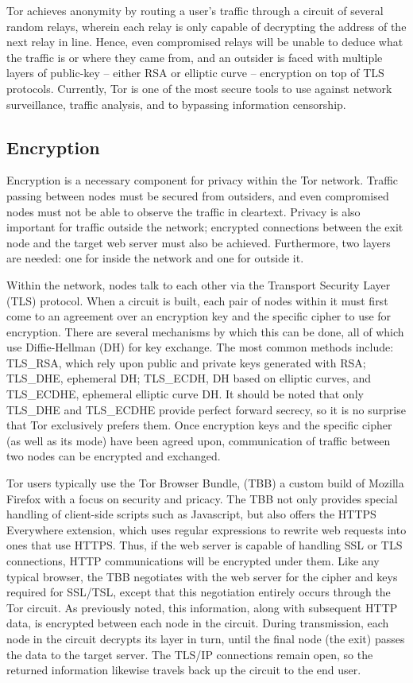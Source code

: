 \documentclass[journal]{IEEEtran}
\begin{document}
Tor achieves anonymity by routing a user's traffic through a circuit of several random relays, wherein each relay is only capable of decrypting the address of the next relay in line. Hence, even compromised relays will be unable to deduce what the traffic is or where they came from, and an outsider is faced with multiple layers of public-key -- either RSA or elliptic curve -- encryption on top of TLS protocols. Currently, Tor is one of the most secure tools to use against network surveillance, traffic analysis, and to bypassing information censorship.

\subsection{Encryption}

Encryption is a necessary component for privacy within the Tor network. Traffic passing between nodes must be secured from outsiders, and even compromised nodes must not be able to observe the traffic in cleartext. Privacy is also important for traffic outside the network; encrypted connections between the exit node and the target web server must also be achieved. Furthermore, two layers are needed: one for inside the network and one for outside it.

Within the network, nodes talk to each other via the Transport Security Layer (TLS) protocol. When a circuit is built, each pair of nodes within it must first come to an agreement over an encryption key and the specific cipher to use for encryption. There are several mechanisms by which this can be done, all of which use Diffie-Hellman (DH) for key exchange. The most common methods include: TLS_RSA, which rely upon public and private keys generated with RSA; TLS_DHE, ephemeral DH; TLS_ECDH, DH based on elliptic curves, and TLS_ECDHE, ephemeral elliptic curve DH. It should be noted that only TLS_DHE and TLS_ECDHE provide perfect forward secrecy, so it is no surprise that Tor exclusively prefers them. Once encryption keys and the specific cipher (as well as its mode) have been agreed upon, communication of traffic between two nodes can be encrypted and exchanged.

Tor users typically use the Tor Browser Bundle, (TBB) a custom build of Mozilla Firefox with a focus on security and pricacy. The TBB not only provides special handling of client-side scripts such as Javascript, but also offers the HTTPS Everywhere extension, which uses regular expressions to rewrite web requests into ones that use HTTPS. Thus, if the web server is capable of handling SSL or TLS connections, HTTP communications will be encrypted under them. Like any typical browser, the TBB negotiates with the web server for the cipher and keys required for SSL/TSL, except that this negotiation entirely occurs through the Tor circuit. As previously noted, this information, along with subsequent HTTP data, is encrypted between each node in the circuit. During transmission, each node in the circuit decrypts its layer in turn, until the final node (the exit) passes the data to the target server. The TLS/IP connections remain open, so the returned information likewise travels back up the circuit to the end user.
\end{document}
